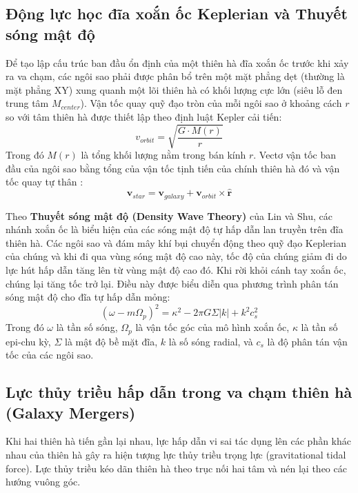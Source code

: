 \documentclass[12pt]{article}
\begin{document}
\subsection{Động lực học đĩa xoắn ốc Keplerian và Thuyết sóng mật độ}
Để tạo lập cấu trúc ban đầu ổn định của một thiên hà đĩa xoắn ốc trước khi xảy ra va chạm, các ngôi sao phải được phân bổ trên một mặt phẳng dẹt (thường là mặt phẳng XY) xung quanh một lõi thiên hà có khối lượng cực lớn (siêu lỗ đen trung tâm $M_{center}$). Vận tốc quay quỹ đạo tròn của mỗi ngôi sao ở khoảng cách $r$ so với tâm thiên hà được thiết lập theo định luật Kepler cải tiến:
\begin{equation}
v_{orbit} = \sqrt{\frac{G \cdot M(r)}{r}}
\end{equation}
Trong đó $M(r)$ là tổng khối lượng nằm trong bán kính $r$. Vectơ vận tốc ban đầu của ngôi sao bằng tổng của vận tốc tịnh tiến của chính thiên hà đó và vận tốc quay tự thân \cite{binney2008}:
\begin{equation}
\mathbf{v}_{star} = \mathbf{v}_{galaxy} + \mathbf{v}_{orbit} \times \mathbf{\hat{r}}
\end{equation}

Theo \textbf{Thuyết sóng mật độ (Density Wave Theory)} của Lin và Shu, các nhánh xoắn ốc là biểu hiện của các sóng mật độ tự hấp dẫn lan truyền trên đĩa thiên hà. Các ngôi sao và đám mây khí bụi chuyển động theo quỹ đạo Keplerian của chúng và khi đi qua vùng sóng mật độ cao này, tốc độ của chúng giảm đi do lực hút hấp dẫn tăng lên từ vùng mật độ cao đó. Khi rời khỏi cánh tay xoắn ốc, chúng lại tăng tốc trở lại. Điều này được biểu diễn qua phương trình phân tán sóng mật độ cho đĩa tự hấp dẫn mỏng:
\begin{equation}
(\omega - m\Omega_p)^2 = \kappa^2 - 2\pi G \Sigma |k| + k^2 c_s^2
\end{equation}
Trong đó $\omega$ là tần số sóng, $\Omega_p$ là vận tốc góc của mô hình xoắn ốc, $\kappa$ là tần số epi-chu kỳ, $\Sigma$ là mật độ bề mặt đĩa, $k$ là số sóng radial, và $c_s$ là độ phân tán vận tốc của các ngôi sao.

\subsection{Lực thủy triều hấp dẫn trong va chạm thiên hà (Galaxy Mergers)}
Khi hai thiên hà tiến gần lại nhau, lực hấp dẫn vi sai tác dụng lên các phần khác nhau của thiên hà gây ra hiện tượng lực thủy triều trọng lực (gravitational tidal force). Lực thủy triều kéo dãn thiên hà theo trục nối hai tâm và nén lại theo các hướng vuông góc. 
\end{document}
